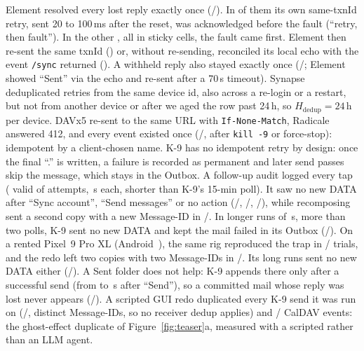  Element resolved every lost reply exactly once (\RealElemRL/\RealElemRL). In \RealElemAckedFirst{} of them its own same-txnId retry, sent 20 to 100\,ms after the reset,
was acknowledged before the fault (``retry, then fault''). In the other \RealElemFaultFirst, all in sticky cells, the fault came first. Element then re-sent the same txnId (\RealElemFaultResend)
or, without re-sending, reconciled its local echo with the event \texttt{/sync} returned (\RealElemFaultSync). A withheld reply also stayed exactly once (\RealTimeoutOnce/\RealTimeoutN; Element showed ``Sent'' via the echo and re-sent after a 70\,s timeout). Synapse deduplicated retries from the same device id, also across a re-login or a restart, but not from another device or after we aged the row past 24\,h, so $H_{\mathrm{dedup}}{=}24$\,h per device. DAVx5 re-sent to the same URL with \texttt{If-None-Match}, Radicale answered 412, and every event existed
once (\RealCalOnce/\RealCalN, \RealCalKill{} after \texttt{kill -9} or force-stop): idempotent by a client-chosen name. K-9 has no idempotent retry by design: once the final ``.'' is written, a failure is recorded as permanent and later send passes skip the
message, which stays in the Outbox. A follow-up audit logged every tap (\RealAuditN{} valid of \RealAuditAttemptsN{} attempts, \RealAuditWindow\,s each, shorter than K-9's 15-min poll). It saw no new DATA after
``Sync account'', ``Send messages'' or no action (\RealAuditSyncData/\RealAuditSyncN, \RealAuditSendmsgsData/\RealAuditSendmsgsN, \RealAuditNoneData/\RealAuditNoneN),
while recomposing sent a second copy with a new Message-ID in \RealAuditRecomposeDup/\RealAuditRecomposeN. In \RealKlongN{} longer runs of \RealKlongObsS\,s, more than two polls, K-9 sent no new DATA and kept the mail failed in its Outbox (\RealKlongError/\RealKlongN). On a rented Pixel~9 Pro XL (Android~\PixAndroid), the same rig reproduced the trap in \PixKRep/\PixKN{} trials,
and the redo left two copies with two Message-IDs in \PixKDup/\PixKN. Its long runs sent no new DATA either (\PixKlongRep/\PixKlongN). A Sent folder does not help: K-9 appends there only after a successful
send (from \RealKAppendLo{} to \RealKAppendHi\,s after ``Send''), so a committed mail whose reply was lost never appears (\RealKSentWrong/\RealKSentN). A scripted GUI redo duplicated every K-9 send it
was run on (\RealKRecDup/\RealKRecN, distinct Message-IDs, so no receiver dedup applies) and \RealCalRecDup/\RealCalRecN{} CalDAV events: the ghost-effect duplicate of
Figure~\ref{fig:teaser}a, measured with a scripted rather than an LLM agent.


